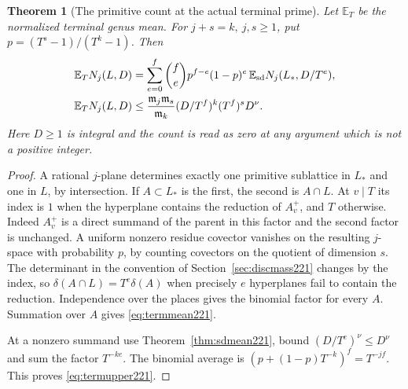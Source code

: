 \documentclass[a4paper,11pt]{article}
\newtheorem{theorem}[proposition]{Theorem}
\theoremstyle{definition}
\theoremstyle{remark}
\numberwithin{equation}{section}
\begin{document}
\begin{theorem}[The primitive count at the actual terminal prime]
\label{thm:termmean221}
Let \(\mathbb E_T\) be the normalized terminal genus mean.
For \(j+s=k,\ j,s\ge1\), put \(p=(T^s-1)/(T^k-1)\). Then
\begin{align}
  \mathbb E_T N_j(L,D)
   &=\sum_{e=0}^f\binom fe p^{f-e}(1-p)^e\,
                      \mathbb E_{\rm sd}N_j(L_*,D/T^e),
                   \label{eq:termmean221}\\
  \mathbb E_T N_j(L,D)
   &\le \frac{\mathfrak m_j\mathfrak m_s}{\mathfrak m_k}
          (D/T^f)^k (T^f)^s D^\nu . \label{eq:termupper221}
\end{align}
Here \(D\ge1\) is integral and the count is read as zero at
any argument which is not a positive integer.
\end{theorem}
\begin{proof}
A rational \(j\)-plane determines exactly one primitive
sublattice in \(L_*\) and one in \(L\), by intersection.
If \(A\subset L_*\) is the first, the second is \(A\cap L\).
At \(v\mid T\) its index is \(1\) when the hyperplane
contains the reduction of \(A_v^+\), and \(T\) otherwise.
Indeed \(A_v^+\) is a direct summand of the parent in this
factor and the second factor is unchanged. A uniform
nonzero residue covector vanishes on the resulting
\(j\)-space with probability \(p\), by counting covectors
on the quotient of dimension \(s\). The determinant in the
convention of Section~\ref{sec:discmass221} changes by the
index, so \(\delta(A\cap L)=T^e\delta(A)\) when precisely
\(e\) hyperplanes fail to contain the reduction. Independence
over the places gives the binomial factor for every \(A\).
Summation over \(A\) gives \eqref{eq:termmean221}.

At a nonzero summand use Theorem~\ref{thm:sdmean221}, bound
\((D/T^e)^\nu\le D^\nu\) and sum the factor \(T^{-ke}\).
The binomial average is
\((p+(1-p)T^{-k})^f=T^{-jf}\). This proves
\eqref{eq:termupper221}.
\end{proof}
\end{document}
